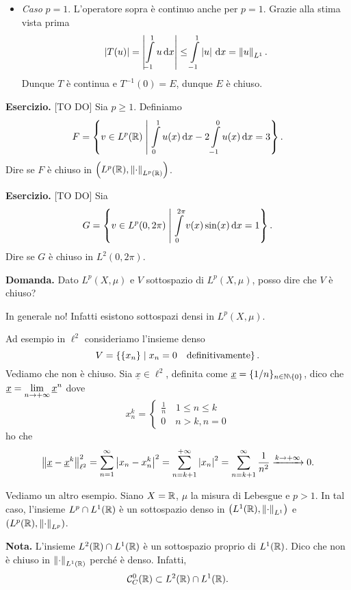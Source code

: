 \documentclass[a4paper, 12pt]{report}
\begin{document}
\begin{enumerate}
\begin{itemize}
\item \textit{Caso} $p = 1$. L'operatore sopra è continuo anche per $p = 1$. Grazie alla stima vista prima
%
$$
\left| T(u) \right| = \left| \int\limits_{\mathclap{-1}}^{1} u \dd x  \right| \leq \int\limits_{\mathclap{-1}}^{1} \left| u \right| \dd x = \norm{u}_{L^1}.
$$
%
Dunque $T$ è continua e $T^{-1}(0) = E$, dunque $E$ è chiuso.

\end{itemize}

\end{enumerate}

\textbf{Esercizio.} [TO DO] Sia $p \geq 1$. Definiamo 
%
$$
F = \left\{ v \in L^p(\R) \mymid \int\limits_{\mathclap{0}}^{1} u(x) \dd x - 2 \int\limits_{\mathclap{-1}}^{0} u(x) \dd x = 3 \right\}.
$$
%
Dire se $F$ è chiuso in $\left( L^p(\mathbb R), \left\lVert \cdot  \right\rVert_{L^p(\mathbb R)} \right)$.


\textbf{Esercizio.} [TO DO] Sia 
%
$$
G = \left\{ v \in L^p(0,2\pi) \mymid \int\limits_{\mathclap{0}}^{2\pi} v(x) \sin(x) \dd x = 1  \right\}.
$$
%
Dire se $G$ è chiuso in $L^2(0,2\pi)$.

\textbf{Domanda.} Dato $L^p (X,\mu)$ e $V$ sottospazio di $L^p(X,\mu)$, posso dire che $V$ è chiuso?

In generale no! Infatti esistono sottospazi densi in $L^p(X,\mu)$.

Ad esempio in $\ell^2$ consideriamo l'insieme denso
%
$$
V = \left\{ \left\{ x_n \right\} \;\middle|\; x_n = 0 \quad \text{definitivamente}  \right\}.
$$
%
Vediamo che non è chiuso. Sia $\underline{x} \in \ell^2$, definita come $\underline{x} = \{ 1 / n \}_{n \in \N \setminus \{0 \}}$, dico che $\displaystyle \underline{x} = \lim_{n \to +\infty} \underline{x}^n$ dove
%
$$
x_n^k = 
\begin{cases}
\frac{1}{n} \quad 1 \leq n \leq k \\
0 \quad n > k, n = 0
\end{cases} 
$$
%
ho che
%
$$
\left\lVert \underline{x} - \underline{x}^k \right\rVert_{\ell^2}^2 = \sum_{n=1}^{\infty} \left| x_n -x_n^k \right|^2 = \sum_{n = k+1}^{+\infty} \left| x_n \right|^2 = \sum_{n = k+1}^{\infty} \frac{1}{n^2} \xrightarrow{k \to +\infty} 0.   
$$
%

Vediamo un altro esempio. Siano $X = \mathbb R$, $\mu$ la misura di Lebesgue e $p > 1$.
In tal caso, l'insieme $L^p \cap L^1 (\mathbb R)$ è un sottospazio denso in $\left( L^1(\mathbb R), \left\lVert \cdot  \right\rVert_{L^1} \right)$ e $\left( L^p(\mathbb R), \left\lVert \cdot  \right\rVert_{L^p} \right)$.

\textbf{Nota.} L'insieme $L^2(\mathbb R) \cap L^1(\mathbb R)$ è un sottospazio proprio di $L^1(\mathbb R)$. Dico che non è chiuso in $\left\lVert \cdot  \right\rVert_{L^1(\mathbb R)}$ perché è denso.
Infatti, 
%
$$
\mathcal{C}_C^0(\mathbb R) \subset L^2(\mathbb R) \cap L^1(\mathbb R).
$$
%
\end{document}
